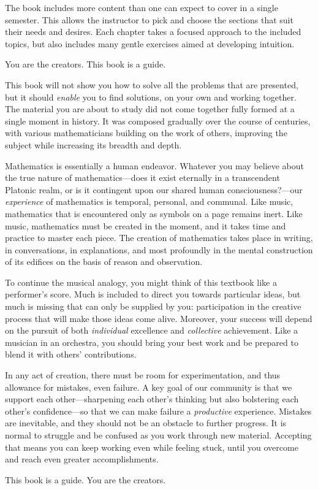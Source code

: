 The book includes more content than one can expect to cover in a single semester. This allows the instructor to pick and choose the sections that suit their needs and desires. Each chapter takes a focused approach to the included topics, but also includes many gentle exercises aimed at developing intuition.





You are the creators. This book is a guide.

This book will not show you how to solve all the problems that are presented, but it should \emph{enable} you to find solutions, on your own and working together. The material you are about to study did not come together fully formed at a single moment in history. It was composed gradually over the course of centuries, with various mathematicians building on the work of others, improving the subject while increasing its breadth and depth.

Mathematics is essentially a human endeavor. Whatever you may believe about the true nature of mathematics---does it exist eternally in a transcendent Platonic realm, or is it contingent upon our shared human consciousness?---our \emph{experience} of mathematics is temporal, personal, and communal. Like music, mathematics that is encountered only as symbols on a page remains inert. Like music, mathematics must be created in the moment, and it takes time and practice to master each piece. The creation of mathematics takes place in writing, in conversations, in explanations, and most profoundly in the mental construction of its edifices on the basis of reason and observation.

To continue the musical analogy, you might think of this textbook like a performer's score. Much is included to direct you towards particular ideas, but much is missing that can only be supplied by you: participation in the creative process that will make those ideas come alive. Moreover, your success will depend on the pursuit of both \emph{individual} excellence and \emph{collective} achievement. Like a musician in an orchestra, you should bring your best work and be prepared to blend it with others' contributions.

In any act of creation, there must be room for experimentation, and thus allowance for mistakes, even failure. A key goal of our community is that we support each other---sharpening each other's thinking but also bolstering each other's confidence---so that we can make failure a \emph{productive} experience. Mistakes are inevitable, and they should not be an obstacle to further progress. It is normal to struggle and be confused as you work through new material. Accepting that means you can keep working even while feeling stuck, until you overcome and reach even greater accomplishments.

This book is a guide. You are the creators.